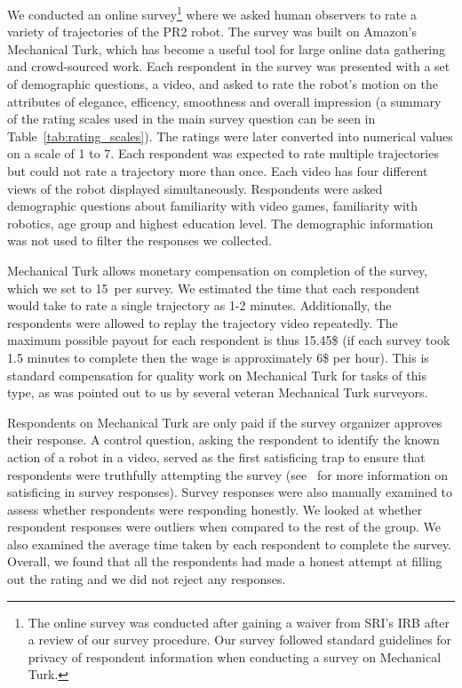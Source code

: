 \documentclass[letterpaper, 10 pt, conference]{ieeeconf}  %
\begin{document}
We conducted an online survey\footnote{The online survey was conducted after gaining a waiver from SRI's IRB after a review of our survey procedure. Our survey followed standard guidelines for privacy of respondent information when conducting a survey on Mechanical Turk.} where we asked human observers to rate a variety of trajectories of the PR2 robot. The survey was built on Amazon's Mechanical Turk, which has become a useful tool for large online data gathering and crowd-sourced work. Each respondent in the survey was presented with a set of demographic questions, a video, and asked to rate the robot's motion on the attributes  of elegance, efficency, smoothness and overall impression (a summary of the rating scales used in the main survey question can be seen in Table~\ref{tab:rating_scales}). The ratings were later converted into numerical values on a scale of 1 to 7. Each respondent was expected to rate multiple trajectories but could not rate a trajectory more than once. Each video has four different views of the robot displayed simultaneously. Respondents were asked demographic questions about familiarity with video games, familiarity with robotics, age group and highest education level. The demographic information was not used to filter the responses we collected.  

Mechanical Turk allows monetary compensation on completion of the survey, which we set to 15\textcent~per survey. We estimated the time that each respondent would take to rate a single trajectory as 1-2 minutes. Additionally, the respondents were allowed to replay the trajectory video repeatedly. The maximum possible payout for each respondent is thus 15.45\$ (if each survey took 1.5 minutes to complete then the wage is approximately 6\$ per hour). This is standard compensation for quality work on Mechanical Turk for tasks of this type, as was pointed out to us by several veteran Mechanical Turk surveyors. 

Respondents on Mechanical Turk are only paid if the survey organizer approves their response. A control question, asking the respondent to identify the known action of a robot in a video, served as the first satisficing trap to ensure that respondents were truthfully attempting the survey (see~\cite{krosnick1996satisficing} for more information on satisficing in survey responses). Survey responses were also manually examined to assess whether respondents were responding honestly. We looked at whether respondent responses were outliers when compared to the rest of the group. We also examined the average time taken by each respondent to complete the survey. Overall, we found that all the respondents had made a honest attempt at filling out the rating and we did not reject any responses. 
\end{document}

